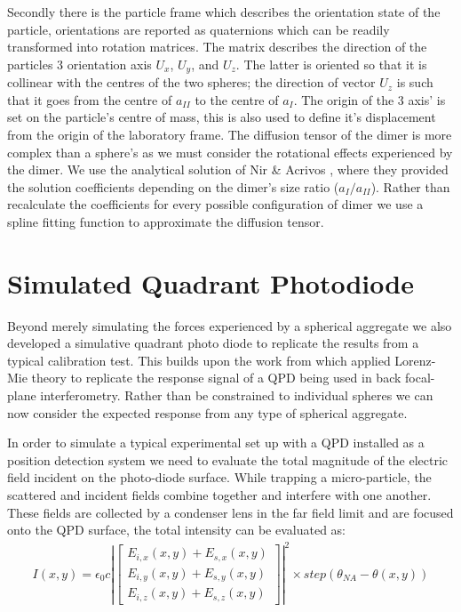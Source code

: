 Secondly there is the particle frame which describes the orientation 
state of the particle, orientations are reported as quaternions which 
can be readily transformed into rotation matrices. The matrix describes 
the direction of the particles 3 orientation axis $U_x$, $U_y$, and 
$U_z$. The latter is oriented so that it is collinear with the centres
of the two spheres; the direction of vector $U_z$ is such that it goes 
from the centre of $a_{II}$ to the centre of $a_{I}$. The origin of the 
3 axis' is set on the particle's centre of mass, this is also used to 
define it's displacement from the origin of the laboratory frame. The 
diffusion tensor of the dimer is more complex than a sphere's as we must consider the rotational effects experienced by the dimer. We use the 
analytical solution of Nir \& Acrivos \cite{Nir1973}, where they provided 
the solution coefficients depending on the dimer's size ratio 
($a_I/a_{II}$). Rather than recalculate the coefficients for every possible configuration of dimer we use a spline fitting function to approximate 
the diffusion tensor. 
\section{Simulated Quadrant Photodiode}
\label{sec:simulated_QPD}

Beyond merely simulating the forces experienced by a spherical 
aggregate we also developed a simulative quadrant photo diode 
to replicate the results from a typical calibration test. This 
builds upon the work from \cite{Rohrbach2002} which applied 
Lorenz-Mie theory to replicate the response signal of a QPD 
being used in back focal-plane interferometry. Rather than be 
constrained to individual spheres we can now consider the 
expected response from any type of spherical aggregate. 

In order to simulate a typical experimental set up with a QPD 
installed as a position detection system we need to evaluate 
the total magnitude of the electric field incident on the 
photo-diode surface. While trapping a micro-particle, the 
scattered and incident fields combine together and interfere 
with one another. These fields are collected by a condenser 
lens in the far field limit and are focused onto the QPD 
surface, the total intensity can be evaluated as:
\begin{align}
I(x,y) = \epsilon_0c\left|
\begin{bmatrix} 
	E_{i,x}(x,y)+E_{s,x}(x,y) \\ 
	E_{i,y}(x,y)+E_{s,y}(x,y) \\ 
	E_{i,z}(x,y)+E_{s,z}(x,y)
\end{bmatrix} \right|^2 \times step(\theta_{NA}-\theta(x,y))
\end{align}

